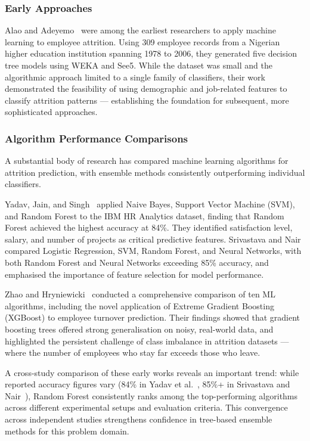 \documentclass[12pt,a4paper]{article}
\begin{document}
\subsubsection{Early Approaches}

Alao and Adeyemo~\cite{alao2013attrition} were among the earliest researchers to apply machine learning to employee attrition. Using 309 employee records from a Nigerian higher education institution spanning 1978 to 2006, they generated five decision tree models using WEKA and See5. While the dataset was small and the algorithmic approach limited to a single family of classifiers, their work demonstrated the feasibility of using demographic and job-related features to classify attrition patterns --- establishing the foundation for subsequent, more sophisticated approaches.

\subsubsection{Algorithm Performance Comparisons}

A substantial body of research has compared machine learning algorithms for attrition prediction, with ensemble methods consistently outperforming individual classifiers.

Yadav, Jain, and Singh~\cite{yadav2018attrition} applied Naive Bayes, Support Vector Machine (SVM), and Random Forest to the IBM HR Analytics dataset, finding that Random Forest achieved the highest accuracy at 84\%. They identified satisfaction level, salary, and number of projects as critical predictive features. Srivastava and Nair~\cite{srivastava2018attrition} compared Logistic Regression, SVM, Random Forest, and Neural Networks, with both Random Forest and Neural Networks exceeding 85\% accuracy, and emphasised the importance of feature selection for model performance.

Zhao and Hryniewicki~\cite{zhao2018turnover} conducted a comprehensive comparison of ten ML algorithms, including the novel application of Extreme Gradient Boosting (XGBoost) to employee turnover prediction. Their findings showed that gradient boosting trees offered strong generalisation on noisy, real-world data, and highlighted the persistent challenge of class imbalance in attrition datasets --- where the number of employees who stay far exceeds those who leave.

A cross-study comparison of these early works reveals an important trend: while reported accuracy figures vary (84\% in Yadav et al.~\cite{yadav2018attrition}, 85\%+ in Srivastava and Nair~\cite{srivastava2018attrition}), Random Forest consistently ranks among the top-performing algorithms across different experimental setups and evaluation criteria. This convergence across independent studies strengthens confidence in tree-based ensemble methods for this problem domain.
\end{document}
